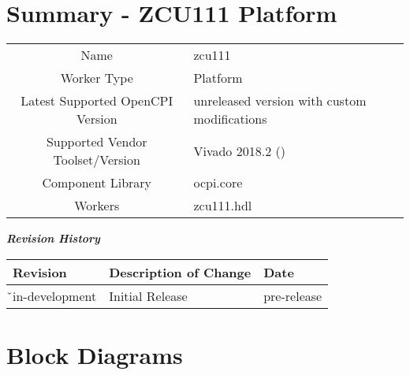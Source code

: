 \documentclass{article}
\author{} %
\date{Version \docVersion} %
\title{\docTitle}
\def\docVersion{\color{red}in-development}
\def\comp{zcu111}
\def\Comp{ZCU111 Platform}
\begin{document}
\section*{Summary - \Comp}
\begin{tabular}{|c|M{6cm}|}
	\hline
	                  &                                                    \\
	\hline
	Name              & \comp                                              \\
	\hline
	Worker Type       & Platform                                           \\


	\hline
	Latest Supported OpenCPI Version & \color{red}unreleased version with custom modifications \\%
	\hline
	Supported Vendor Toolset/Version & Vivado 2018.2 (\color{red}{requires unreleased version of opencpi with custom modifications}) \\
	\hline
	Component Library & ocpi.core                                   \\
	\hline
	Workers & \comp.hdl                                        \\
	\hline
\end{tabular}

\begin{center}
  \textit{\textbf{Revision History}}
  \begin{longtable}{|p{3cm}|p{11cm}|p{2.4cm}|}
    \hline
    \rowcolor{blue}
    \textbf{Revision} & \textbf{Description of Change} & \textbf{Date} \\
    \hline
    \v\docVersion& Initial Release & \color{red}pre-release \\
    \hline
  \end{longtable}
\end{center}

\section{Block Diagrams}
\end{document}
